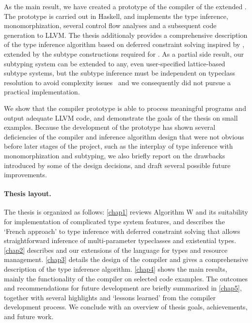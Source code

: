As the main result, we have created a prototype of the compiler of the extended \cmm. The prototype is carried out in Haskell, and implements the type inference, monomorphization, several control flow analyses and a subsequent code generation to LLVM. The thesis additionaly provides a comprehensive description of the type inference algorithm based on deferred constraint solving inspired by \citet{vytiniotis2011outsidein}, extended by the subtype constructions required for \cmm. As a partial side result, our subtyping system can be extended to any, even user-specified lattice-based subtype systems, but the subtype inference must be independent on typeclass resolution to avoid complexity issues~\cite{tiuryn1992subtype,frey1997subtype} and we consequently did not pursue a practical implementation.

We show that the compiler prototype is able to process meaningful programs and output adequate LLVM code, and demonstrate the goals of the thesis on small examples. Because the development of the prototype has shown several deficiencies of the compiler and inference algorithm design that were not obvious before later stages of the project, such as the interplay of type inference with monomorphization and subtyping, we also briefly report on the drawbacks introduced by some of the design decisions, and draft several possible future improvements.

\paragraph{Thesis layout.}
The thesis is organized as follows:
\cref{chap1} reviews Algorithm W and its suitability for implementation of complicated type system features, and describes the `French approach' to type inference with deferred constraint solving that allows straightforward inference of multi-parameter typeclasses and existential types.
\cref{chap2} describes \cmm and our extensions of the language for types and resource management.
\cref{chap3} details the design of the compiler and gives a comprehensive description of the type inference algorithm.
\cref{chap4} shows the main results, mainly the functionality of the compiler on selected code examples.
The outcomes and recommendations for future development are briefly summarized in \cref{chap5}, together with several highlights and `lessons learned' from the compiler development process.
We conclude with an overview of thesis goals, achievements, and future work.
